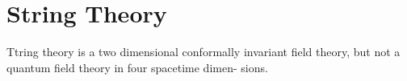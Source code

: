 \chapter{String Theory}
Ttring theory is a two dimensional conformally invariant field
theory, but not a quantum field theory in four spacetime dimen-
sions.